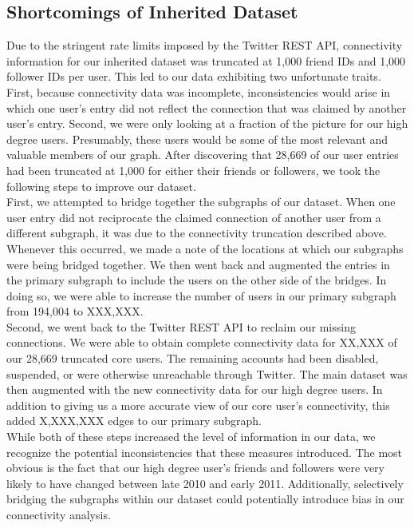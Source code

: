 \subsection{Shortcomings of Inherited Dataset}
Due to the stringent rate limits imposed by the Twitter REST API, connectivity information for our inherited dataset was truncated at 1,000 friend IDs and 1,000 follower IDs per user.  This led to our data exhibiting two unfortunate traits.  First, because connectivity data was incomplete, inconsistencies would arise in which one user's entry did not reflect the connection that was claimed by another user's entry.  Second, we were only looking at a fraction of the picture for our high degree users.  Presumably, these users would be some of the most relevant and valuable members of our graph.  After discovering that 28,669 of our user entries had been truncated at 1,000 for either their friends or followers, we took the following steps to improve our dataset.\\
First, we attempted to bridge together the subgraphs of our dataset.  When one user entry did not reciprocate the claimed connection of another user from a different subgraph, it was due to the connectivity truncation described above.  Whenever this occurred, we made a note of the locations at which our subgraphs were being bridged together.  We then went back and augmented the entries in the primary subgraph to include the users on the other side of the bridges.  In doing so, we were able to increase the number of users in our primary subgraph from 194,004 to XXX,XXX.\\
Second, we went back to the Twitter REST API to reclaim our missing connections.  We were able to obtain complete connectivity data for XX,XXX of our 28,669 truncated core users.  The remaining accounts had been disabled, suspended, or were otherwise unreachable through Twitter.  The main dataset was then augmented with the new connectivity data for our high degree users.  In addition to giving us a more accurate view of our core user's connectivity, this added X,XXX,XXX edges to our primary subgraph.\\
While both of these steps increased the level of information in our data, we recognize the potential inconsistencies that these measures introduced.  The most obvious is the fact that our high degree user's friends and followers were very likely to have changed between late 2010 and early 2011.  Additionally, selectively bridging the subgraphs within our dataset could potentially introduce bias in our connectivity analysis.\\

